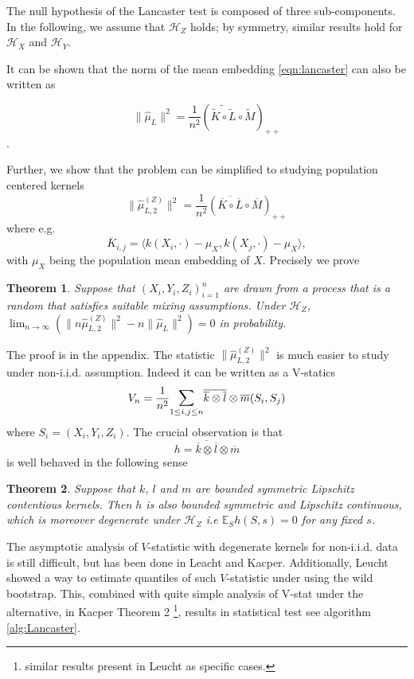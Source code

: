 \documentclass[]{article}
\newtheorem{theorem}{Theorem}
\begin{document}
The null hypothesis of the Lancaster test is composed of three sub-components. In the following, we assume that $\mathcal{H}_Z$ holds; by symmetry, similar results hold for $\mathcal{H}_X$ and $\mathcal{H}_Y$.

It can be shown that the norm of the mean embedding \eqref{eqn:lancaster} can also be written as

\[ \|\hat \mu_L\|^2 = \frac{1}{n^2}\left(\widetilde{\tilde{K}\circ\tilde{L}}\circ\tilde{M}\right)_{++}\].

Further, we show that the problem can be simplified to studying population centered kernels
\[
\| \hat \mu^{(Z)}_{L,2} \|^2 =\frac{1}{n^2}\left(\overline{\overline{K}\circ\overline{L}}\circ\overline{M}\right)_{++}
\]
where e.g. 
\[
\overline{K}_{i,j} = \langle k(X_i,\cdot)-\mu_X, k(X_j,\cdot) -\mu_X \rangle,
\]
with $\mu_X$ being the population mean embedding of $X$. Precisely we prove
\begin{theorem}\label{theorem:norm-conv-in-prob} Suppose that $(X_i,Y_i,Z_i)_{i=1}^n$ are drawn from a process that is a random that satisfies suitable mixing assumptions. Under $\mathcal{H}_Z$, $\lim_{n \to \infty} ( \| n\hat \mu^{(Z)}_{L,2} \|^2 - n\|\hat \mu_L\|^2 ) =0 $ in probability.
\end{theorem}
The proof is in the appendix. The statistic $\| \hat \mu^{(Z)}_{L,2} \|^2$ is much easier to study under non-i.i.d.  assumption. Indeed it can be written as a V-statics 
\[ 
V_n = \frac{1}{n^2} \mathlarger{\sum}_{1\leq i,j \leq n} \overline{\overline{k} \otimes \overline{l}}\otimes \overline{m} (S_i,S_j)
\]
where  $S_i = (X_i,Y_i,Z_i)$. The crucial observation is that
\[
 h = \overline{\overline{k} \otimes \overline{l}}\otimes \overline{m}
\]
is well behaved in the following sense 
\begin{theorem}\label{theorem:degenerate-kernel}
Suppose that $k$, $l$ and $m$ are bounded symmetric Lipschitz contentious kernels. Then $h$ is also bounded symmetric and Lipschitz continuous, which is moreover degenerate under $\mathcal{H}_Z$ i.e $\mathbb{E}_{S}h(S,s)=0$ for any fixed $s$.
\end{theorem}
The asymptotic analysis of $V$-statistic with degenerate kernels for non-i.i.d. data  is still difficult, but has been done in Leacht and Kacper. Additionally, Leucht showed a way to estimate quantiles of such $V$-statistic under using the  wild bootstrap. This, combined with quite simple analysis of V-stat under the alternative, in Kacper Theorem 2 \footnote{similar results present in Leucht as specific cases.}, results in statistical test see algorithm \ref{alg:Lancaster}.
\end{document}
